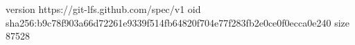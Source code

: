 version https://git-lfs.github.com/spec/v1
oid sha256:b9c78f903a66d72261e9339f514fb64820f704e77f283fb2e0ce0f0ecca0e240
size 87528
